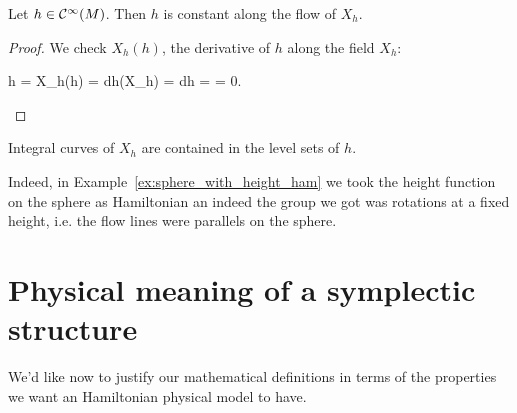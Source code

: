 \documentclass[main.tex]{subfiles}
\begin{document}
\begin{theorem}
	Let $h \in \mathcal{C}^\infty(M)$. Then $h$ is constant along the flow of $X_h$.
\end{theorem}
\begin{proof}
	We check $X_h(h)$, the derivative of $h$ along the field $X_h$:
	\begin{eqalign}
		h = X_h(h) = dh(X_h) =  dh = \ipr{X_h}  \omega = 0.
	\end{eqalign}
\end{proof}
\begin{corollary}
	Integral curves of $X_h$ are contained in the level sets of $h$.
\end{corollary}

Indeed, in Example~\ref{ex:sphere_with_height_ham} we took the height function on the sphere as Hamiltonian an indeed the group we got was rotations at a fixed height, i.e. the flow lines were parallels on the sphere.

\section{Physical meaning of a symplectic structure}
We'd like now to justify our mathematical definitions in terms of the properties we want an Hamiltonian physical model to have.
\end{document}
